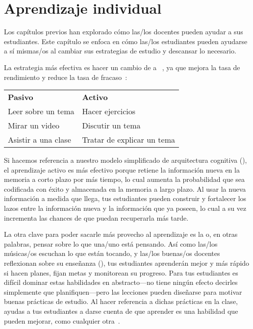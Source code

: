 \chapter{Aprendizaje individual}\label{s:individual}

Los capítulos previos han explorado cómo las/los docentes pueden ayudar a sus estudiantes.
Este capítulo se enfoca en cómo las/los estudiantes pueden ayudarse a sí mismas/os
al cambiar sus estrategias de estudio y descansar lo necesario.

La estrategia más efectiva es hacer un cambio de 
a ~\cite{Hpl2018},
ya que mejora la tasa de rendimiento y reduce la tasa de fracaso~\cite{Free2014}:

\begin{longtable}{ll}
\textbf{Pasivo}        & \textbf{Activo} \\
Leer sobre un tema        & Hacer ejercicios \\
Mirar un video            & Discutir un tema \\
Asistir a una clase        & Tratar de explicar un tema
\end{longtable}

\noindent
Si hacemos referencia a nuestro modelo simplificado de arquitectura cognitiva (),
el aprendizaje activo es más efectivo porque retiene la información nueva en la memoria a corto plazo por más tiempo,
lo cual aumenta la probabilidad que sea codificada con éxito y almacenada en la memoria a largo plazo.
Al usar la nueva información a medida que llega,
tus estudiantes pueden construir y fortalecer los lazos entre la información nueva y la información que ya poseen,
lo cual a su vez incrementa las chances de que puedan recuperarla más tarde.

La otra clave para poder sacarle más provecho al aprendizaje es la 
o, en otras palabras, pensar sobre lo que una/uno está pensando.
Así como las/los músicas/os escuchan lo que están tocando,
y las/los buenas/os docentes reflexionan sobre su enseñanza (),
tus estudiantes aprenderán mejor y más rápido si hacen planes,
fijan metas
y monitorean su progreso.
Para tus estudiantes es difícil dominar estas habilidades en abstracto---no tiene
ningún efecto decirles simplemente que planifiquen---pero
las lecciones pueden diseñarse para motivar buenas prácticas de estudio.
Al hacer referencia a dichas prácticas en la clase,
ayudas a tus estudiantes a darse cuenta de que aprender es una habilidad que pueden mejorar, como cualquier otra~\cite{McGu2015,Miya2018}.

